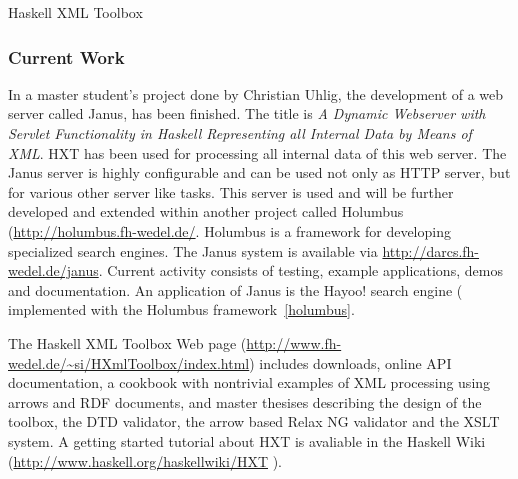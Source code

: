 \begin{hcarentry}{Haskell XML Toolbox}
\subsubsection*{Current Work}

In a master student's project done by Christian Uhlig, the development of a web server called Janus,
has been finished.
The title is \emph{A Dynamic Webserver with Servlet Functionality in
  Haskell Representing all Internal Data by Means of XML}.
HXT has been used for processing all internal data of this web server.
The Janus server is highly configurable and can be used not only as HTTP server, but for
various other server like tasks.
This server is used and will be further developed and extended within another
project called Holumbus (\url{http://holumbus.fh-wedel.de/}.
Holumbus is a framework for developing specialized
search engines.
The Janus system is available via \url{http://darcs.fh-wedel.de/janus}.
Current activity consists of testing, example applications, demos and documentation.
An application of Janus is the Hayoo! search engine (
implemented with the Holumbus framework~\cref{holumbus}.

\FurtherReading

The Haskell XML Toolbox Web page
(\url{http://www.fh-wedel.de/~si/HXmlToolbox/index.html})
includes downloads, online API documentation, a cookbook with nontrivial examples
of XML processing using arrows and RDF documents, and master thesises describing the
design of the toolbox, the DTD validator, the arrow based Relax NG
validator and the XSLT system.
A getting started tutorial about HXT is avaliable in the Haskell Wiki (\url{http://www.haskell.org/haskellwiki/HXT}
).
\end{hcarentry}
